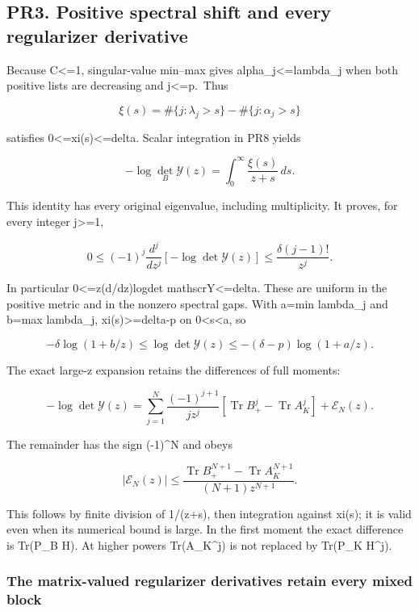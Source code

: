 \documentclass[11pt]{article}
\begin{document}
\subsection{PR3. Positive spectral shift and every regularizer derivative}\label{pr3.-positive-spectral-shift-and-every-regularizer-derivative}

Because \textbar\textbar C\textbar\textbar\textless=1, singular-value min--max gives alpha\_j\textless=lambda\_j when both positive lists are decreasing and j\textless=p.~Thus

\[
\xi(s)=\#\{j:\lambda_j>s\}-\#\{j:\alpha_j>s\}
\]

satisfies 0\textless=xi(s)\textless=delta. Scalar integration in PR8 yields

\[
\boxed{
-\log\det_B\mathscr Y(z)
=\int_0^\infty\frac{\xi(s)}{z+s}\,ds.
}
\tag{PR9}
\]

This identity has every original eigenvalue, including multiplicity. It proves, for every integer j\textgreater=1,

\[
0\le(-1)^j\frac{d^j}{dz^j}[-\log\det\mathscr Y(z)]
\le\frac{\delta(j-1)!}{z^j}.
\tag{PR10}
\]

In particular 0\textless=z(d/dz)logdet mathscrY\textless=delta. These are uniform in the positive metric and in the nonzero spectral gaps. With a=min lambda\_j and b=max lambda\_j, xi(s)\textgreater=delta-p on 0\textless s\textless a, so

\[
-\delta\log(1+b/z)\le\log\det\mathscr Y(z)
\le-(\delta-p)\log(1+a/z).
\tag{PR11}
\]

The exact large-z expansion retains the differences of full moments:

\[
-\log\det\mathscr Y(z)
=\sum_{j=1}^{N}\frac{(-1)^{j+1}}{jz^j}
[\operatorname{Tr}B_+^j-\operatorname{Tr}A_K^j]+\mathcal E_N(z).
\]

The remainder has the sign (-1)\^{}N and obeys

\[
|\mathcal E_N(z)|\le
\frac{\operatorname{Tr}B_+^{N+1}-\operatorname{Tr}A_K^{N+1}}
{(N+1)z^{N+1}}.
\tag{PR12}
\]

This follows by finite division of 1/(z+s), then integration against xi(s); it is valid even when its numerical bound is large. In the first moment the exact difference is Tr(P\_B H). At higher powers Tr(A\_K\^{}j) is not replaced by Tr(P\_K H\^{}j).

\subsubsection{The matrix-valued regularizer derivatives retain every mixed block}\label{the-matrix-valued-regularizer-derivatives-retain-every-mixed-block}
\end{document}
